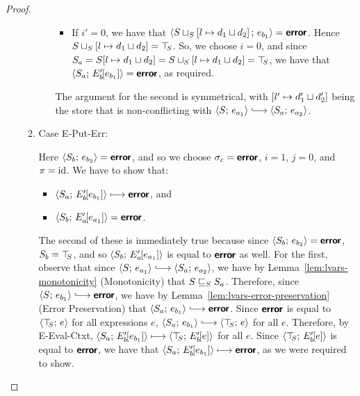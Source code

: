 \begin{proof}
\begin{enumerate}
\begin{enumerate}
\begin{itemize}
\begin{itemize}
          \item If $i' = 0$, we have that
            $\langle S \sqcup_{S} \left[ l \mapsto d_1 \sqcup d_2 \right];\, e_{b_1} \rangle
            = \textbf{\textsf{error}}$.  Hence
            $S \sqcup_{S} \left[ l \mapsto d_1 \sqcup d_2 \right]
            = \top\hspace{-0.85mm}_{S}$.  So, we choose $i = 0$, and since $S_a =
            S[l \mapsto d_1 \sqcup d_2] =
            S \sqcup_{S} \left[ l \mapsto d_1 \sqcup d_2 \right]
            = \top\hspace{-0.85mm}_{S}$, we have that
            $\langle S_a;\, E'_b\hspace{-1mm}\left[e_{b_1}\right] \rangle = \textbf{\textsf{error}}$, as
            required.
        \end{itemize}

        The argument for the second is symmetrical, with
        $\left[ l' \mapsto d'_1 \sqcup d'_2 \right]$ being the
        store that is non-conflicting with $\config{S}{e_{a_1}}
        \parstepsto \config{S_a}{e_{a_2}}$.

      \end{itemize}

    \item \label{lvars-slc-put-put-err}Case {\sc E-Put-Err}:

      Here $\langle S_b;\, e_{b_2} \rangle = \textbf{\textsf{error}}$, and so we choose $\sigma_c
      = \textbf{\textsf{error}}$, $i = 1$, $j = 0$, and $\pi = \mathrm{id}$.  We have to show that:
      \begin{itemize}
      \item $\langle S_a;\, E'_b\hspace{-1mm}\left[e_{b_1}\right] \rangle \longmapsto
        \textbf{\textsf{error}}$, and
      \item
        $\langle S_b;\, E'_a\hspace{-1mm}\left[e_{a_1}\right] \rangle = \textbf{\textsf{error}}$.
      \end{itemize}

      The second of these is immediately true because since
      $\langle S_b;\, e_{b_2} \rangle = \textbf{\textsf{error}}$, $S_b = \top\hspace{-0.85mm}_{S}$, and so
      $\langle S_b;\, E'_a\hspace{-1mm}\left[e_{a_1}\right] \rangle$ is equal to $\textbf{\textsf{error}}$ as
      well.  For the first, observe that since $\config{S}{e_{a_1}}
      \parstepsto \config{S_a}{e_{a_2}}$, we have by
      Lemma~\ref{lem:lvars-monotonicity} (Monotonicity) that
      $S \sqsubseteq_S S_a$.  Therefore, since $\config{S}{e_{b_1}}
      \parstepsto \error$, we have by
      Lemma~\ref{lem:lvars-error-preservation} (Error Preservation)
      that $\config{S_a}{e_{b_1}} \parstepsto \error$.  Since $\textbf{\textsf{error}}$
      is equal to $\langle \top\hspace{-0.85mm}_{S};\, e \rangle$ for all expressions $e$,
      $\config{S_a}{e_{b_1}} \parstepsto \config{\topS}{e}$ for all
      $e$.  Therefore, by {\sc E-Eval-Ctxt},
      $\langle S_a;\, E'_b\hspace{-1mm}\left[e_{b_1}\right] \rangle \longmapsto
      \langle \top\hspace{-0.85mm}_{S};\, E'_b\hspace{-1mm}\left[e\right] \rangle$ for all $e$.  Since
      $\langle \top\hspace{-0.85mm}_{S};\, E'_b\hspace{-1mm}\left[e\right] \rangle$ is equal to $\textbf{\textsf{error}}$, we
      have that $\langle S_a;\, E'_b\hspace{-1mm}\left[e_{b_1}\right] \rangle \longmapsto
      \textbf{\textsf{error}}$, as we were required to show.


\end{enumerate}
\end{enumerate}
\end{proof}
